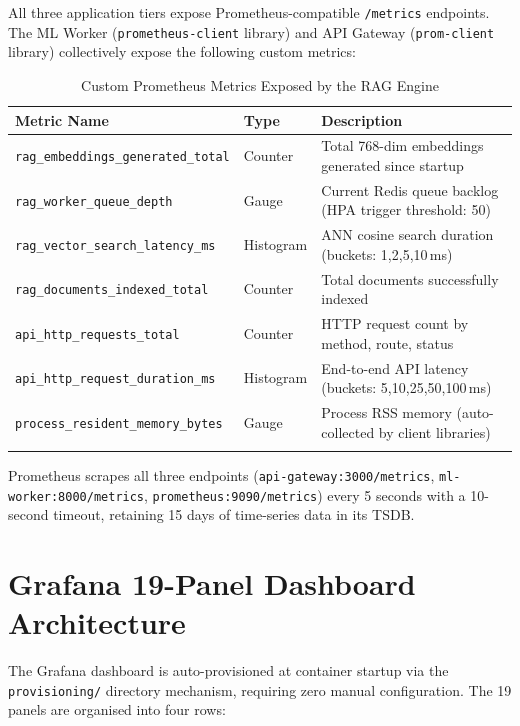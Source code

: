 \documentclass[12pt,a4paper]{report}
\begin{document}
All three application tiers expose Prometheus-compatible \texttt{/metrics}
endpoints. The ML Worker (\texttt{prometheus-client} library) and API Gateway
(\texttt{prom-client} library) collectively expose the following custom metrics:

\begin{longtable}{@{}p{5.5cm}p{2.0cm}p{6.0cm}@{}}
  \toprule
  \textbf{Metric Name} & \textbf{Type} & \textbf{Description} \\
  \midrule
  \texttt{rag\_embeddings\_generated\_total} & Counter &
    Total 768-dim embeddings generated since startup \\[0.2cm]
  \texttt{rag\_worker\_queue\_depth} & Gauge &
    Current Redis queue backlog (HPA trigger threshold: 50) \\[0.2cm]
  \texttt{rag\_vector\_search\_latency\_ms} & Histogram &
    ANN cosine search duration (buckets: 1,2,5,10\,ms) \\[0.2cm]
  \texttt{rag\_documents\_indexed\_total} & Counter &
    Total documents successfully indexed \\[0.2cm]
  \texttt{api\_http\_requests\_total} & Counter &
    HTTP request count by method, route, status \\[0.2cm]
  \texttt{api\_http\_request\_duration\_ms} & Histogram &
    End-to-end API latency (buckets: 5,10,25,50,100\,ms) \\[0.2cm]
  \texttt{process\_resident\_memory\_bytes} & Gauge &
    Process RSS memory (auto-collected by client libraries) \\
  \bottomrule
  \caption{Custom Prometheus Metrics Exposed by the RAG Engine}
  \label{tab:metrics}
\end{longtable}

Prometheus scrapes all three endpoints
(\texttt{api-gateway:3000/metrics}, \texttt{ml-worker:8000/metrics},
\texttt{prometheus:9090/metrics}) every 5 seconds with a 10-second timeout,
retaining 15 days of time-series data in its TSDB.

\section{Grafana 19-Panel Dashboard Architecture}

The Grafana dashboard is auto-provisioned at container startup via the
\texttt{provisioning/} directory mechanism, requiring zero manual configuration.
The 19 panels are organised into four rows:
\end{document}
